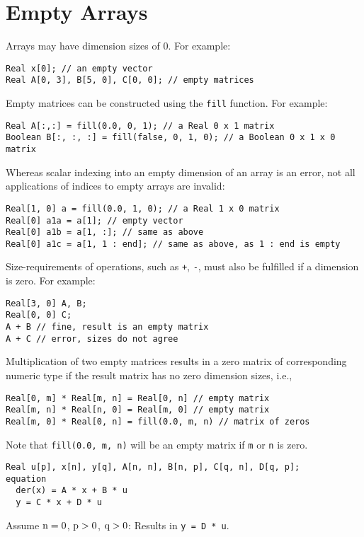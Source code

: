 \section{Empty Arrays}\label{empty-arrays}

Arrays may have dimension sizes of 0.  For example:
\begin{lstlisting}[language=modelica]
Real x[0]; // an empty vector
Real A[0, 3], B[5, 0], C[0, 0]; // empty matrices
\end{lstlisting}

Empty matrices can be constructed using the \lstinline!fill! function.
For example:
\begin{lstlisting}[language=modelica]
Real A[:,:] = fill(0.0, 0, 1); // a Real 0 x 1 matrix
Boolean B[:, :, :] = fill(false, 0, 1, 0); // a Boolean 0 x 1 x 0 matrix
\end{lstlisting}

\begin{example}
Whereas scalar indexing into an empty dimension of an array is an error, not all applications of indices to empty arrays are invalid:
\begin{lstlisting}
Real[1, 0] a = fill(0.0, 1, 0); // a Real 1 x 0 matrix
Real[0] a1a = a[1]; // empty vector
Real[0] a1b = a[1, :]; // same as above
Real[0] a1c = a[1, 1 : end]; // same as above, as 1 : end is empty
\end{lstlisting}
\end{example}

Size-requirements of operations, such as \lstinline!+!, \lstinline!-!, must also be fulfilled if a dimension is zero.  For example:
\begin{lstlisting}[language=modelica]
Real[3, 0] A, B;
Real[0, 0] C;
A + B // fine, result is an empty matrix
A + C // error, sizes do not agree
\end{lstlisting}

Multiplication of two empty matrices results in a zero matrix of corresponding numeric type if the result matrix has no zero dimension sizes, i.e.,
\begin{lstlisting}[language=modelica]
Real[0, m] * Real[m, n] = Real[0, n] // empty matrix
Real[m, n] * Real[n, 0] = Real[m, 0] // empty matrix
Real[m, 0] * Real[0, n] = fill(0.0, m, n) // matrix of zeros
\end{lstlisting}
Note that \lstinline!fill(0.0, m, n)! will be an empty matrix if \lstinline!m! or \lstinline!n! is zero.

\begin{example}
\begin{lstlisting}[language=modelica]
  Real u[p], x[n], y[q], A[n, n], B[n, p], C[q, n], D[q, p];
equation
  der(x) = A * x + B * u
  y = C * x + D * u
\end{lstlisting}
Assume $\text{\lstinline!n!} = 0$, $\text{\lstinline!p!} > 0$, $\text{\lstinline!q!} > 0$: Results in \lstinline!y = D * u!.
\end{example}
